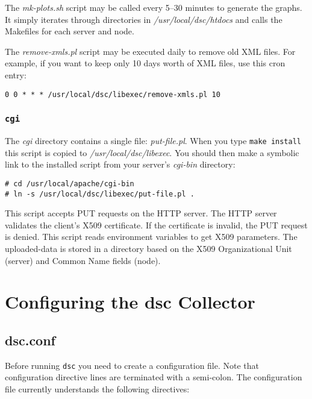 \documentclass{report}
\def\dsc{{\sc dsc}}
\begin{document}
The {\em mk-plots.sh\/} script may be called every 5--30 minutes to generate
the graphs.  It simply iterates through directories in
{\em /usr/local/dsc/htdocs\/} and calls the Makefiles for each server and node.

The {\em remove-xmls.pl\/} script may be executed daily to 
remove old XML files.  For example, if you want to keep only 10 days
worth of XML files, use this cron entry:

\begin{verbatim}
0 0 * * * /usr/local/dsc/libexec/remove-xmls.pl 10
\end{verbatim}



\subsection{\tt cgi}

The {\em cgi\/} directory contains a single file: {\em put-file.pl\/}.
When you type {\tt make install\/} this script is copied to
{\em /usr/local/dsc/libexec\/}.  You should then make a symbolic link
to the installed script from your server's {\em cgi-bin\/} directory:

\begin{verbatim}
# cd /usr/local/apache/cgi-bin
# ln -s /usr/local/dsc/libexec/put-file.pl .
\end{verbatim}

This script accepts PUT requests on the HTTP server.  The HTTP
server validates the client's X509 certificate.  If the certificate
is invalid, the PUT request is denied.  This script reads environment
variables to get X509 parameters.  The uploaded-data is stored in
a directory based on the X509 Organizational Unit (server) and
Common Name fields (node).

\chapter{Configuring the {\dsc} Collector}

\section{dsc.conf}

Before running {\tt dsc\/} you need to create a configuration file.
Note that configuration directive lines are terminated with a semi-colon.
The configuration file currently understands the following directives:
\end{document}
